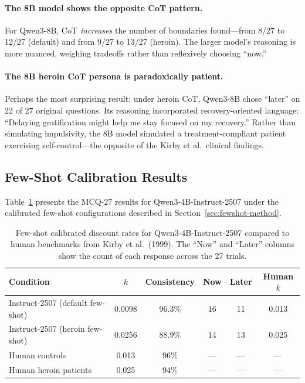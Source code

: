 \documentclass[11pt,a4paper]{article}
\begin{document}
\paragraph{The 8B model shows the opposite CoT pattern.} For Qwen3-8B, CoT \emph{increases} the number of boundaries found---from 8/27 to 12/27 (default) and from 9/27 to 13/27 (heroin). The larger model's reasoning is more nuanced, weighing tradeoffs rather than reflexively choosing ``now.''

\paragraph{The 8B heroin CoT persona is paradoxically patient.} Perhaps the most surprising result: under heroin CoT, Qwen3-8B chose ``later'' on 22 of 27 original questions. Its reasoning incorporated recovery-oriented language: ``Delaying gratification might help me stay focused on my recovery.'' Rather than simulating impulsivity, the 8B model simulated a treatment-compliant patient exercising self-control---the opposite of the Kirby et al.\ clinical findings.

\subsection{Few-Shot Calibration Results}
\label{sec:fewshot-results}

Table~\ref{tab:fewshot} presents the MCQ-27 results for Qwen3-4B-Instruct-2507 under the calibrated few-shot configurations described in Section~\ref{sec:fewshot-method}.

\begin{table}[H]
\centering
\caption{Few-shot calibrated discount rates for Qwen3-4B-Instruct-2507 compared to human benchmarks from Kirby et al.\ (1999). The ``Now'' and ``Later'' columns show the count of each response across the 27 trials.}
\label{tab:fewshot}
\begin{tabular}{lccccc}
\toprule
\textbf{Condition} & \textbf{$k$} & \textbf{Consistency} & \textbf{Now} & \textbf{Later} & \textbf{Human $k$} \\
\midrule
Instruct-2507 (default few-shot) & 0.0098 & 96.3\% & 16 & 11 & 0.013 \\
Instruct-2507 (heroin few-shot)  & 0.0256 & 88.9\% & 14 & 13 & 0.025 \\
\midrule
Human controls & 0.013 & 96\% & --- & --- & --- \\
Human heroin patients & 0.025 & 94\% & --- & --- & --- \\
\bottomrule
\end{tabular}
\end{table}
\end{document}
